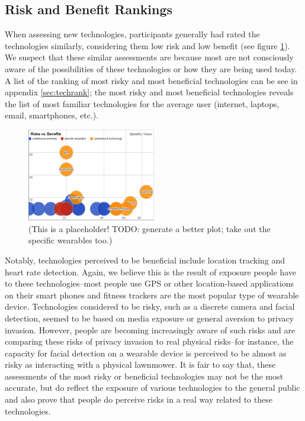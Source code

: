 \documentclass{acm_proc_article-sp}
\begin{document}
\subsection{Risk and Benefit Rankings} 
When assessing new technologies, participants generally had rated the technologies similarly, considering them low risk and low benefit (see figure \ref{fig:techplot}). We suspect that these similar assessments are because most are not consciously aware of the possibilities of these technologies or how they are being used today. A list of the ranking of most risky and most beneficial technologies can be see in appendix \ref{sec:techrank}; the most risky and most beneficial technologies reveals the list of most familiar technologies for the average user (internet, laptops, email, smartphones, etc.). 


\begin{figure}
	\centering
	\includegraphics[width=0.5\textwidth]{techplot.png}
	\caption{(This is a placeholder! TODO: generate a better plot; take out the specific wearables too.)}
	\label{fig:techplot}
\end{figure}

Notably, technologies perceived to be beneficial include location tracking and heart rate detection. Again, we believe this is the result of exposure people have to these technologies--most people use GPS or other location-based applications on their smart phones and fitness trackers are the most popular type of wearable device. Technologies considered to be risky, such as a discrete camera and facial detection, seemed to be based on media exposure or general aversion to privacy invasion. However, people are becoming increasingly aware of such risks and are comparing these risks of privacy invasion to real physical risks--for instance, the capacity for facial detection on a wearable device is perceived to be almost as risky as interacting with a physical lawnmower. It is fair to say that, these assessments of the most risky or beneficial technologies may not be the most accurate, but do reflect the exposure of various technologies to the general public and also prove that people do perceive risks in a real way related to these technologies. 
\end{document}
